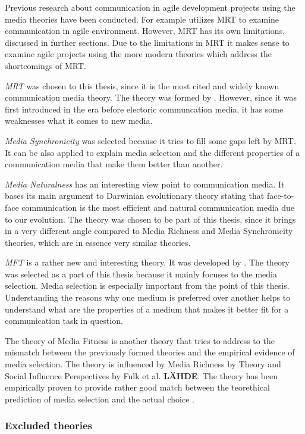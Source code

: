 \documentclass[english,12pt,a4paper,pdftex]{article}
\begin{document}
Previous research about communication in agile development projects using the media theories have been conducted. For example \citet{korkala2006} utilizes \ac{MRT} to examine communication in agile environment. However, \ac{MRT} has its own limitations, discussed in further sections. Due to the limitations in \ac{MRT} it makes sense to examine agile projects using the more modern theories which address the shortcomings of \ac{MRT}.

\emph{\ac{MRT}} was chosen to this thesis, since it is the most cited and widely known communication media theory. The theory was formed by \citet{daft1986}. However, since it was first introduced in the era before electoric communcation media, it has some weaknesses what it comes to new media.

\emph{Media Synchronicity} was selected because it tries to fill some gaps left by \ac{MRT}. It can be also applied to explain media selection and the different properties of a communication media that make them better than another.

\emph{Media Naturalness} has an interesting view point to communication media. It bases its main argument to Darwinian evolutionary theory stating that face-to-face communication is the most efficient and natural communication media due to our evolution. The theory was chosen to be part of this thesis, since it brings in a very different angle compared to Media Richness and Media Synchronicity theories, which are in essence very similar theories.

\emph{\Acl{MFT}} is a rather new and interesting theory. It was developed by \citet{higa2007}. The theory was selected as a part of this thesis because it mainly focuses to the media selection. Media selection is especially important from the point of this thesis. Understanding the reasons why one medium is preferred over another helps to understand what are the properties of a medium that makes it better fit for a communication task in question.

The theory of Media Fitness is another theory that tries to address to the mismatch between the previously formed theories and the empirical evidence of media selection. The theory is influenced by Media Richness by \citet{daft1986} Theory and Social Influence Perspectives by Fulk et al. \textbf{LÄHDE}. The theory has been empirically proven to provide rather good match between the teorethical prediction of media selection and the actual choice \citep{higa2007} \citep{gu2011}.

\subsubsection{Excluded theories}
\end{document}
